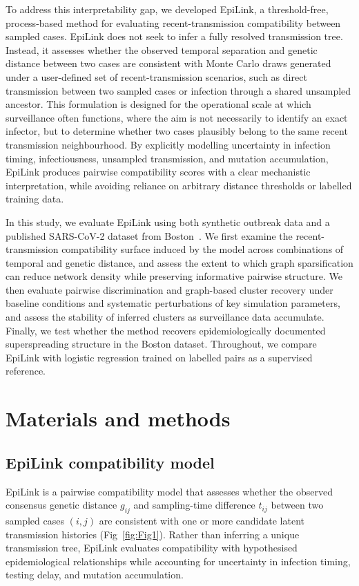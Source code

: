 \documentclass[10pt,letterpaper]{article}
\begin{document}
To address this interpretability gap, we developed EpiLink, a threshold-free, process-based method for evaluating recent-transmission compatibility between sampled cases. EpiLink does not seek to infer a fully resolved transmission tree. Instead, it assesses whether the observed temporal separation and genetic distance between two cases are consistent with Monte Carlo draws generated under a user-defined set of recent-transmission scenarios, such as direct transmission between two sampled cases or infection through a shared unsampled ancestor. This formulation is designed for the operational scale at which surveillance often functions, where the aim is not necessarily to identify an exact infector, but to determine whether two cases plausibly belong to the same recent transmission neighbourhood. By explicitly modelling uncertainty in infection timing, infectiousness, unsampled transmission, and mutation accumulation, EpiLink produces pairwise compatibility scores with a clear mechanistic interpretation, while avoiding reliance on arbitrary distance thresholds or labelled training data.

In this study, we evaluate EpiLink using both synthetic outbreak data and a published SARS-CoV-2 dataset from Boston~\cite{Lemieux2021}. We first examine the recent-transmission compatibility surface induced by the model across combinations of temporal and genetic distance, and assess the extent to which graph sparsification can reduce network density while preserving informative pairwise structure. We then evaluate pairwise discrimination and graph-based cluster recovery under baseline conditions and systematic perturbations of key simulation parameters, and assess the stability of inferred clusters as surveillance data accumulate. Finally, we test whether the method recovers epidemiologically documented superspreading structure in the Boston dataset. Throughout, we compare EpiLink with logistic regression trained on labelled pairs as a supervised reference.

\section*{Materials and methods}

\subsection*{EpiLink compatibility model}

EpiLink is a pairwise compatibility model that assesses whether the observed consensus genetic distance $g_{ij}$ and sampling-time difference $t_{ij}$ between two sampled cases $(i,j)$ are consistent with one or more candidate latent transmission histories (Fig~\ref{fig:Fig1}). Rather than inferring a unique transmission tree, EpiLink evaluates compatibility with hypothesised epidemiological relationships while accounting for uncertainty in infection timing, testing delay, and mutation accumulation.
\end{document}
